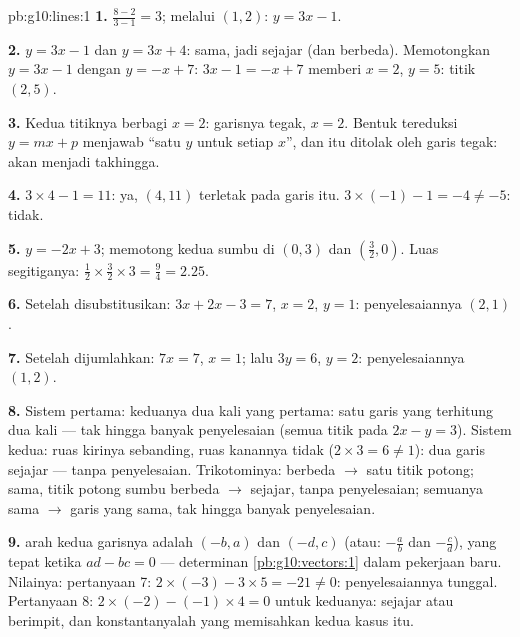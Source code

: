 \begin{solution}{pb:g10:lines:1}
\textbf{1.}  $\frac{8 - 2}{3 - 1} = 3$; melalui $(1, 2)$:
$y = 3x - 1$.

\textbf{2.} $y = 3x - 1$ dan $y = 3x + 4$:  sama, jadi sejajar
(dan berbeda). Memotongkan $y = 3x - 1$ dengan $y = -x + 7$:
$3x - 1 = -x + 7$ memberi $x = 2$, $y = 5$: titik $(2, 5)$.

\textbf{3.} Kedua titiknya berbagi $x = 2$: garisnya tegak,
 $x = 2$. Bentuk tereduksi $y = mx + p$ menjawab ``satu $y$
untuk setiap $x$'', dan itu ditolak oleh garis tegak:  akan
menjadi takhingga.

\textbf{4.} $3 \times 4 - 1 = 11$: ya, $(4, 11)$ terletak pada
garis itu. $3 \times (-1) - 1 = -4 \neq -5$: tidak.

\textbf{5.} $y = -2x + 3$; memotong kedua sumbu di $(0, 3)$ dan
$\left(\frac32, 0\right)$. Luas segitiganya:
$\frac12 \times \frac32 \times 3 = \frac94 = 2.25$.

\textbf{6.} Setelah disubstitusikan: $3x + 2x - 3 = 7$, $x = 2$,
$y = 1$: penyelesaiannya $(2, 1)$.

\textbf{7.} Setelah dijumlahkan: $7x = 7$, $x = 1$; lalu $3y = 6$, $y = 2$:
penyelesaiannya $(1, 2)$.

\textbf{8.} Sistem pertama:  keduanya dua kali yang
pertama: satu garis yang terhitung dua kali --- tak hingga banyak
penyelesaian (semua titik pada $2x - y = 3$). Sistem kedua: ruas kirinya
sebanding, ruas kanannya tidak ($2 \times 3 = 6 \neq 1$): dua
garis sejajar --- tanpa penyelesaian. Trikotominya:  berbeda
$\to$ satu titik potong;  sama, titik potong sumbu berbeda $\to$
sejajar, tanpa penyelesaian; semuanya sama $\to$ garis yang sama, tak hingga
banyak penyelesaian.

\textbf{9.}  arah kedua garisnya adalah $(-b, a)$ dan
$(-d, c)$ (atau:  $-\frac ab$ dan $-\frac cd$), yang 
tepat ketika $ad - bc = 0$ --- determinan
\cref{pb:g10:vectors:1} dalam pekerjaan baru. Nilainya: pertanyaan 7:
$2 \times (-3) - 3 \times 5 = -21 \neq 0$: penyelesaiannya tunggal.
Pertanyaan 8: $2 \times (-2) - (-1) \times 4 = 0$ untuk keduanya:
sejajar atau berimpit, dan konstantanyalah yang memisahkan kedua
kasus itu.


\end{solution}
